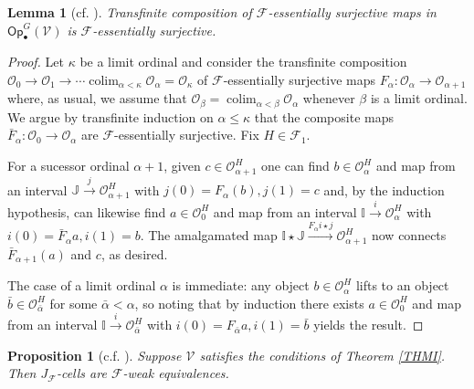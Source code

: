 \documentclass[a4paper,10pt
,draft
]{article}%
\numberwithin{equation}{section}
\numberwithin{figure}{section}
\newtheorem{lemma}[equation]{Lemma}%
\newtheorem{proposition}[equation]{Proposition}%
\theoremstyle{definition} %
\newcommand{\Op}{\mathsf{Op}}%
\DeclareMathOperator{\colim}{colim}%
\newcommand{\F}{\ensuremath{\mathcal F}}
\newcommand{\V}{\ensuremath{\mathcal V}}
\renewcommand{\O}{\ensuremath{\mathcal O}}
\newcommand{\1}{\ensuremath{\mathbbm 1}}%
\begin{document}
\begin{lemma}[cf. {\cite[4.17]{Cav}}]
      \label{TRANSCOMP_ES_LEM}
      Transfinite composition of $\F$-essentially surjective maps in $\Op^G_\bullet(\V)$ is $\F$-essentially surjective.
\end{lemma}



\begin{proof}
Let $\kappa$ be a limit ordinal and consider the transfinite composition
$\O_0 \to \O_1 \to \cdots \colim_{\alpha < \kappa} \O_{\alpha} = \O_{\kappa}$
of $\F$-essentially surjective maps
$F_{\alpha} \colon \O_{\alpha} \to \O_{\alpha +1}$ where, as usual, 
we assume that $\O_{\beta} = \colim_{\alpha < \beta} \O_{\alpha}$ whenever $\beta$ is a limit ordinal.
We argue by transfinite induction on $\alpha \leq \kappa$
that the composite maps $\bar{F}_{\alpha} \colon \O_0 \to \O_{\alpha}$
are $\F$-essentially surjective. Fix $H \in \F_1$.

For a sucessor ordinal $\alpha+1$, given $c \in \O_{\alpha+1}^H$
one can find $b \in \O_\alpha^H$ and map from an interval 
$\mathbb{J} \xrightarrow{j} \O_{\alpha+1}^H$ with $j(0) = F_{\alpha}(b),j(1)=c$
and, by the induction hypothesis, can likewise find
$a \in \O_0^H$ and map from an interval $\mathbb{I} \xrightarrow{i} \O_\alpha^H$
with $i(0)=\bar{F}_{\alpha}a,i(1)=b$.
The amalgamated map
$\mathbb{I} \star \mathbb{J} \xrightarrow{F_{\alpha}i \star j} \O_{\alpha+1}^H$
now connects $\bar{F}_{\alpha+1}(a)$ and $c$, as desired.

The case of a limit ordinal $\alpha$ is immediate: any object $b \in \O_{\alpha}^H$
lifts to an object $\bar{b} \in \O_{\bar{\alpha}}^H$ for some $\bar{\alpha} < \alpha$,
so noting that by induction there exists $a \in \O_0^H$ and map from an interval $\mathbb{I} \xrightarrow{i} \O_{\bar{\alpha}}^H$
with $i(0) = F_{\bar{\alpha}}a,i(1) = \bar{b}$ yields the result.
\end{proof}




\begin{proposition}[{c.f. \cite[4.20]{Cav}}]\label{J-CELL_PROP}
      Suppose $\V$ satisfies {\color{blue} the conditions of Theorem \ref{THMI}}.
      Then $J_{\F}$-cells are $\F$-weak equivalences.
\end{proposition}
\end{document}
